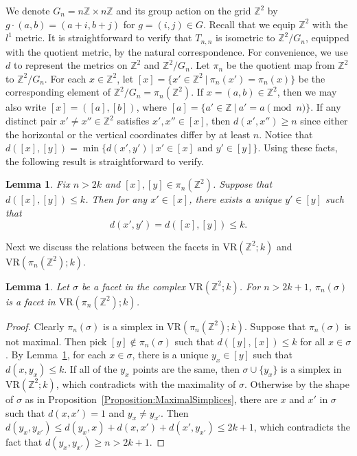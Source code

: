 \documentclass[12pt,a4paper]{amsart}
\newtheorem{lemma}[theorem]{Lemma}
\theoremstyle{definition}
\newcommand{\Z}{\ensuremath{\mathbb{Z}}}
\newcommand{\vr}[2]{\mathrm{VR}(#1;#2)}
\numberwithin{equation}{section}
\begin{document}
We denote $G_n=n\Z\times n\Z$ and its group action on the grid $\Z^2$ by $g\cdot (a, b)= (a+i, b+j)$ for $g=(i, j)\in G$.
Recall that we equip $\Z^2$ with the $l^1$ metric.
It is straightforward to verify that $T_{n, n}$ is isometric to $\Z^2/G_n$, equipped with the quotient metric, by the natural correspondence.
For convenience, we use $d$ to represent the metrics on $\Z^2$ and $\Z^2/G_n$.
Let $\pi_n$ be the quotient map from $\Z^2$ to $\Z^2/G_n$.
For each $x\in \Z^2$, let $[x]=\{x'\in \Z^2~|~\pi_n(x')=\pi_n(x)\}$ be the corresponding element of $\Z^2/G_n = \pi_n(\Z^2)$.
If $x=(a,b)\in\Z^2$, then we may also write $[x]=([a],[b])$, where $[a]=\{a'\in \Z~|~a'=a\pmod n\}$.
If any distinct pair $x' \neq x''\in \Z^2$ satisfies $x', x'' \in [x]$, then $d(x', x'')\geq n$ since either the horizontal or the vertical coordinates differ by at least $n$.
Notice that $d([x], [y]) =\min \{d(x',y')~|~ x' \in [x]\text{ and }y'\in [y] \}$.
Using these facts, the following result is straightforward to verify.

\begin{lemma}
\label{lemma:unique_pre}
Fix $n>2k$ and $[x],[y]\in \pi_n(\Z^2)$.
Suppose that $d([x],[y])\leq k$.
Then for any $x'\in [x]$, there exists a unique $y'\in [y]$ such that
\[d(x',y')=d([x],[y])\leq k.\]
\end{lemma}

Next we discuss the relations between the facets in $\vr{\Z^2}{k}$ and $\vr{\pi_n(\Z^2)}{k}$.

\begin{lemma}
\label{lemma:imageoffacets}
Let $\sigma$ be a facet in the complex $\vr{\Z^2}{k}$.
For $n>2k+1$, $\pi_n(\sigma)$ is a facet in $\vr{\pi_n(\Z^2)}{k}$.
\end{lemma}

\begin{proof}
Clearly $\pi_n(\sigma)$ is a simplex in $\vr{\pi_n(\Z^2)}{k}$.
Suppose that $\pi_n(\sigma)$ is not maximal.
Then pick $[y]\notin \pi_n(\sigma)$ such that $d([y], [x])\leq k$ for all $x\in \sigma$.
By Lemma~\ref{lemma:unique_pre}, for each $x\in \sigma$, there is a unique $y_x\in [y]$ such that $d(x, y_x)
\leq k$.
If all of the $y_x$ points are the same, then $\sigma\cup \{y_x\}$ is a simplex in $\vr{\Z^2}{k}$, which contradicts with the maximality of $\sigma$.
Otherwise by the shape of $\sigma$ as in Proposition~\ref{Proposition:MaximalSimplices}, there are $x$ and $x'$ in $\sigma$ such that $d(x, x')=1$ and $y_x\neq y_{x'}$.
Then $d(y_x, y_{x'})\leq d(y_x, x)+d(x, x') + d(x', y_{x'}) \leq 2k+1$, which contradicts the fact that $d(y_x, y_{x'})\geq n>2k+1$.
\end{proof}
\end{document}
